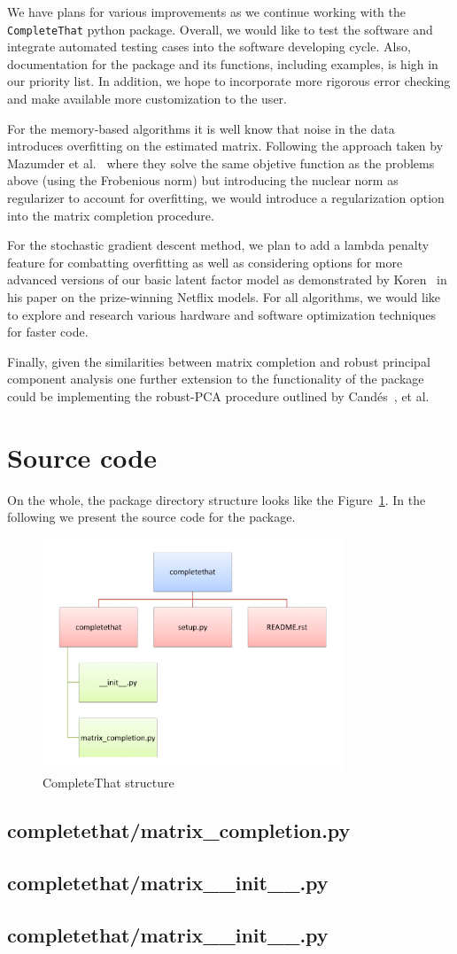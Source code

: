 \documentclass[12pt]{article}
\newcommand{\code}[2] {
  \hrulefill
  \subsection*{#1}
  
  \vspace{2em}
}
\begin{document}
We have plans for various improvements as we continue working with the \texttt{CompleteThat} python package. Overall, we would like to test the software and integrate automated testing cases into the software developing cycle. Also, documentation for the package and its functions, including examples, is high in our priority list. In addition, we hope to incorporate more rigorous error checking and make   available more customization to the user. 

For the memory-based algorithms it is well know that noise in the data introduces overfitting on the estimated matrix. Following the approach taken by Mazumder et al.~\cite{mazumder:2010}  where they solve the same objetive function as the problems above (using the Frobenious norm) but introducing the nuclear norm as regularizer to account for overfitting, we would introduce a regularization option into the matrix completion procedure. 

For the stochastic gradient descent method, we plan to add a lambda penalty feature for combatting overfitting as well as considering options for more advanced versions of our basic latent factor model as demonstrated by Koren~\cite{koren:2008} in his paper on the prize-winning Netflix models. 
For all algorithms, we would like to explore and research various hardware and software optimization techniques for faster code. 

Finally, given the similarities between matrix completion and robust principal component analysis one further extension to the functionality of the package could be implementing the robust-PCA procedure outlined by Cand\'es~\cite{candes:2011}, et al.

\newpage



\newpage
\section{Source code}
On the whole, the package directory structure looks like the Figure~\ref{fig:code_scheme}. In the following we present the source code for the package.
\begin{figure}[h!]
  \centering
    \includegraphics[width=0.8\textwidth]{./figures/code_scheme.pdf}
    \caption{CompleteThat structure}
    \label{fig:code_scheme}
\end{figure}

\code{completethat/matrix\_completion.py}{../code/completethat/matrix_completion.py}
\code{completethat/matrix\_\_init\_\_.py}{../code/completethat/__init__.py}
\code{completethat/matrix\_\_init\_\_.py}{../code/setup.py}
\end{document}
